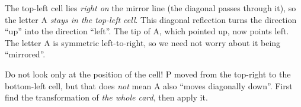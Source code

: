 {
The top-left cell lies \emph{right on} the mirror line (the diagonal passes through it), so the letter A
\emph{stays in the top-left cell}. This diagonal reflection turns the direction ``up'' into the direction
``left''. The tip of A, which pointed up, now points left. The letter A is symmetric left-to-right, so we need
not worry about it being ``mirrored''.

\begin{warnbox}Do not look only at the position of the cell! P moved from the top-right to the bottom-left
cell, but that does \emph{not} mean A also ``moves diagonally down''. First find the transformation of
\emph{the whole card}, then apply it.\end{warnbox}

}

